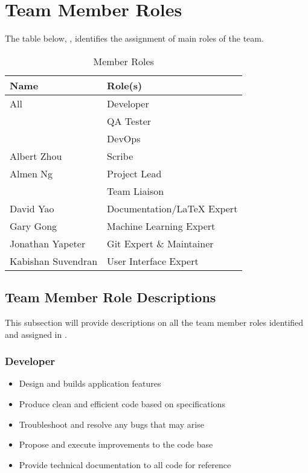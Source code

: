 \documentclass[12pt,letterpaper]{article}
\begin{document}
\section{Team Member Roles}
The table below, , identifies the assignment of main
roles of the team.
\begin{table}[hp!] 
    \centering
    \begin{tabularx}{\textwidth}{|X|X|}
        \toprule
        \textbf{Name} & \textbf{Role(s)}\\
        \midrule
        All                         & Developer\\
                                    & QA Tester\\
                                    & DevOps \\
        \hline
        Albert Zhou                 & Scribe\\
        \hline
        Almen Ng                    & Project Lead\\
        & Team Liaison\\
        \hline
        David Yao                   & Documentation/LaTeX Expert\\
        \hline
        Gary Gong                   & Machine Learning Expert \\
        \hline
        Jonathan Yapeter            & Git Expert \& Maintainer\\
        \hline
        Kabishan Suvendran          & User Interface Expert\\
        \bottomrule
    \end{tabularx}
\caption{Member Roles} \label{tab:memberRoles}
\end{table}

\subsection{Team Member Role Descriptions}
This subsection will provide descriptions on all the team member roles
identified and assigned in .
\subsubsection{Developer}
\begin{itemize}
    \item Design and builds application features
    \item Produce clean and efficient code based on specifications 
    \item Troubleshoot and resolve any bugs that may arise 
    \item Propose and execute improvements to the code base
    \item Provide technical documentation to all code for reference
\end{itemize}
\end{document}
